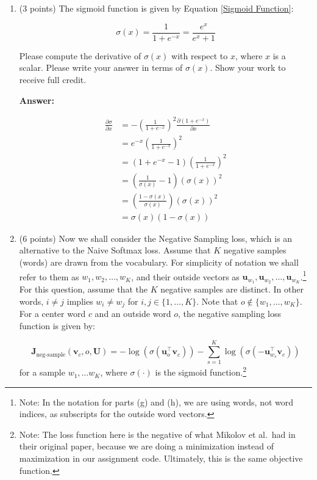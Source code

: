 \documentclass{article}
\newenvironment{answer}{
    {\bf Answer:} \sf \begingroup\color{red}
}{\endgroup}%
\begin{document}
\begin{enumerate}[label=(\alph*)]
\item (3 points) The sigmoid function is given by Equation \ref{Sigmoid Function}:

\begin{equation}
    \label{Sigmoid Function}
    \sigma (x) = \frac{1}{1 + e^{-x}} = \frac{e^{x}}{e^{x} + 1}
\end{equation}

Please compute the derivative of $\sigma(x)$ with respect to $x$, where $x$ is a scalar. Please write your answer in terms of $\sigma(x)$. Show your work to receive full credit.

\begin{shaded}
\begin{answer}
    \begin{align*}
        \frac{\partial \sigma}{\partial x}
        & = -(\frac{1}{1 + e^{-x}})^2\frac{\partial(1 + e^{-x})}{\partial x} \\
        & = e^{-x}(\frac{1}{1 + e^{-x}})^2 \\
        & = (1 + e^{-x} - 1)(\frac{1}{1 + e^{-x}})^2 \\
        & = (\frac{1}{\sigma(x)}-1)(\sigma(x))^2 \\
        & = (\frac{1 - \sigma(x)}{\sigma(x)})(\sigma(x))^2 \\
        & = \sigma(x)(1 - \sigma(x))
    \end{align*}\label{partial sigma}
\end{answer}
\end{shaded}

\item (6 points) Now we shall consider the Negative Sampling loss, which is an alternative to the Naive Softmax loss.  Assume that $K$ negative samples (words) are drawn from the vocabulary. For simplicity of notation we shall refer to them as $w_1, w_2, \dots, w_K$, and their outside vectors as $\bm u_{w_1}, \bm u_{w_2}, \dots, \bm u_{w_K}$.\footnote{Note: In the notation for parts (g) and (h), we are using words, not word indices, as subscripts for the outside word vectors.} For this question, assume that the $K$ negative samples are distinct. In other words, $i\neq j$ implies $w_i\neq w_j$ for $i,j\in\{1,\dots,K\}$.
Note that $o\notin\{w_1, \dots, w_K\}$. 
For a center word $c$ and an outside word $o$, the negative sampling loss function is given by:

\begin{equation}
\bm J_{\text{neg-sample}}(\bm v_c, o, \bm U) = -\log(\sigma(\bm u_o^\top \bm v_c)) - \sum_{s=1}^K \log(\sigma(-\bm u_{w_s}^\top \bm v_c))
\end{equation}
for a sample $w_1, \ldots w_K$, where $\sigma(\cdot)$ is the sigmoid function.\footnote{Note: The loss function here is the negative of what Mikolov et al.\ had in their original paper, because we are doing a minimization instead of maximization in our assignment code. Ultimately, this is the same objective function.}


\end{enumerate}
\end{document}
